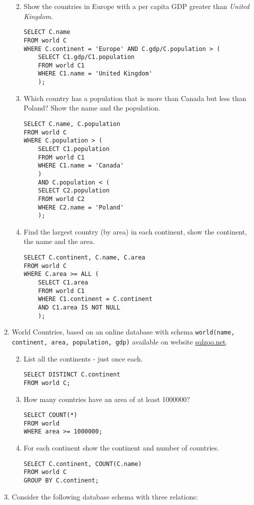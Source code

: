 \begin{enumerate}
\begin{enumerate}
\setcounter{enumii}{1}
\item Show the countries in Europe with a per capita GDP greater than \textit{United Kingdom}.
\begin{lstlisting}
SELECT C.name
FROM world C
WHERE C.continent = 'Europe' AND C.gdp/C.population > (
	SELECT C1.gdp/C1.population
	FROM world C1
	WHERE C1.name = 'United Kingdom'
	);
\end{lstlisting}
\setcounter{enumii}{3}
\item Which country has a population that is more than Canada but less than Poland? Show the name and the population.
\begin{lstlisting}
SELECT C.name, C.population
FROM world C
WHERE C.population > (
	SELECT C1.population
	FROM world C1
	WHERE C1.name = 'Canada'
	)
	AND C.population < (
	SELECT C2.population
	FROM world C2
	WHERE C2.name = 'Poland'
	);
\end{lstlisting}
\setcounter{enumii}{5}
\item Find the largest country (by area) in each continent, show the continent, the name and the area.
\begin{lstlisting}
SELECT C.continent, C.name, C.area
FROM world C
WHERE C.area >= ALL (
	SELECT C1.area
	FROM world C1
	WHERE C1.continent = C.continent
	AND C1.area IS NOT NULL
	);
\end{lstlisting}
\end{enumerate}
\item World Countries, based on an online database with schema \texttt{world(name, continent, area, population, gdp)} available on website \href{http://sqlzoo.net/wiki/SUM_and_COUNT}{sqlzoo.net}.
\begin{enumerate}
\setcounter{enumii}{1}
\item List all the continents - just once each.
\begin{lstlisting}
SELECT DISTINCT C.continent
FROM world C;
\end{lstlisting}
\setcounter{enumii}{3}
\item How many countries have an area of at least 1000000?
\begin{lstlisting}
SELECT COUNT(*)
FROM world
WHERE area >= 1000000;
\end{lstlisting}
\setcounter{enumii}{5}
\item For each continent show the continent and number of countries.
\begin{lstlisting}
SELECT C.continent, COUNT(C.name)
FROM world C
GROUP BY C.continent;
\end{lstlisting}
\end{enumerate}
\item Consider the following database schema with three relations:


\end{enumerate}
